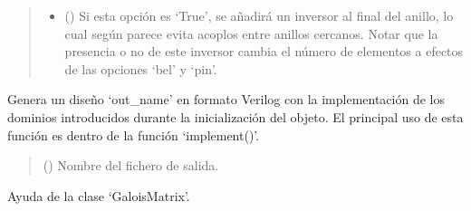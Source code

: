 \documentclass[letterpaper,10pt,english]{sphinxmanual}
\begin{document}
\begin{fulllineitems}
\begin{quote}
\begin{description}
\begin{itemize}
\item {} 
\sphinxAtStartPar
{} (\sphinxstyleliteralemphasis{\sphinxupquote{, }}) \textendash{} Si esta opción es ‘True’, se añadirá un inversor al final del anillo, lo cual según parece evita acoplos entre anillos cercanos. Notar que la presencia o no de este inversor cambia el número de elementos a efectos de las opciones ‘bel’ y ‘pin’.

\end{itemize}

\end{description}\end{quote}

\begin{fulllineitems}
\label{\detokenize{fpga.ring_osc:fpga.ring_osc.GaloisMatrix.gen_garomatrix}}
\pysigstartsignatures
{}
\pysigstopsignatures
\sphinxAtStartPar
Genera un diseño ‘out\_name’ en formato Verilog con la implementación de los dominios introducidos durante la inicialización del objeto. El principal uso de esta función es dentro de la función ‘implement()’.
\begin{quote}\begin{description}
\sphinxAtStartPar
{} (\sphinxstyleliteralemphasis{\sphinxupquote{, }}) \textendash{} Nombre del fichero de salida.

\end{description}\end{quote}

\end{fulllineitems}


\begin{fulllineitems}
\label{\detokenize{fpga.ring_osc:fpga.ring_osc.GaloisMatrix.help}}
\pysigstartsignatures
{}
\pysigstopsignatures
\sphinxAtStartPar
Ayuda de la clase ‘GaloisMatrix’.


\end{fulllineitems}
\end{fulllineitems}
\end{document}

